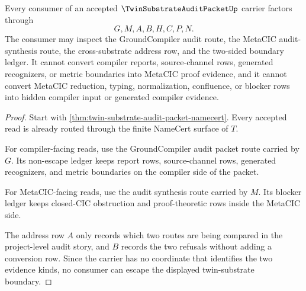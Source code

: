 \begin{theorem}
\label{thm:twin-substrate-audit-packet-nonescape}
Every consumer of an accepted $\TwinSubstrateAuditPacketUp$ carrier factors through
$$
G,M,A,B,H,C,P,N.
$$
The consumer may inspect the GroundCompiler audit route, the MetaCIC audit-synthesis route, the cross-substrate address row, and the two-sided boundary ledger. It cannot convert compiler reports, source-channel rows, generated recognizers, or metric boundaries into MetaCIC proof evidence, and it cannot convert MetaCIC reduction, typing, normalization, confluence, or blocker rows into hidden compiler input or generated compiler evidence.
\end{theorem}
\begin{proof}
Start with \autoref{thm:twin-substrate-audit-packet-namecert}. Every accepted read is already routed through the finite NameCert surface of $T$.

For compiler-facing reads, use the GroundCompiler audit packet route carried by $G$. Its non-escape ledger keeps report rows, source-channel rows, generated recognizers, and metric boundaries on the compiler side of the packet.

For MetaCIC-facing reads, use the audit synthesis route carried by $M$. Its blocker ledger keeps closed-CIC obstruction and proof-theoretic rows inside the MetaCIC side.

The address row $A$ only records which two routes are being compared in the project-level audit story, and $B$ records the two refusals without adding a conversion row. Since the carrier has no coordinate that identifies the two evidence kinds, no consumer can escape the displayed twin-substrate boundary.
\end{proof}


\begin{closurestatus}{\TwinSubstrateAuditPacketUp}
  \theoryclosure{\seedClosure}
  \formalstatus{\unformalizedV}
\end{closurestatus}
